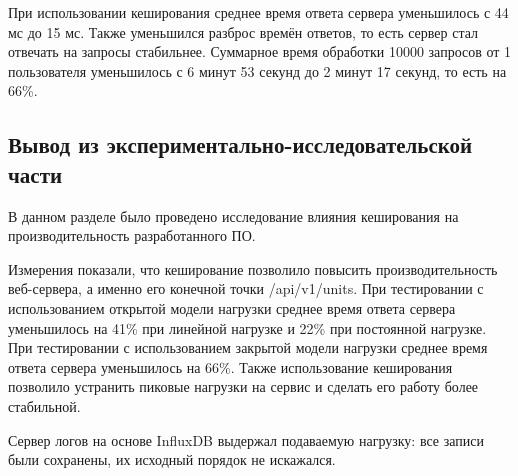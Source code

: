 \clearpage

При использовании кеширования среднее время ответа сервера уменьшилось с 44 мс до 15 мс. Также уменьшился разброс времён ответов, то есть сервер стал отвечать на запросы стабильнее. %
Суммарное время обработки 10000 запросов от 1 пользователя уменьшилось с 6 минут 53 секунд до 2 минут 17 секунд, то есть на 66\%.



\subsection*{Вывод из экспериментально-исследовательской части}



В данном разделе было проведено исследование влияния кеширования на производительность разработанного ПО.

Измерения показали, что кеширование позволило повысить производительность веб-сервера, а именно его конечной точки /api/v1/units. При тестировании с использованием открытой модели нагрузки среднее время ответа сервера уменьшилось на 41\% при линейной нагрузке и 22\% при постоянной нагрузке. При тестировании с использованием закрытой модели нагрузки среднее время ответа сервера уменьшилось на 66\%. Также использование кеширования позволило устранить пиковые нагрузки на сервис и сделать его работу более стабильной.

Сервер логов на основе InfluxDB выдержал подаваемую нагрузку: все записи были сохранены, их исходный порядок не искажался.



\pagebreak